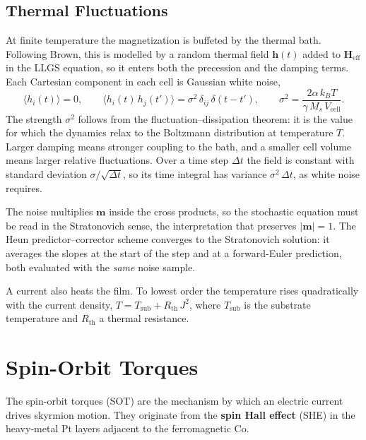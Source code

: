 \documentclass[11pt,a4paper]{article}
\newcommand{\mb}[1]{\mathbf{#1}}
\newcommand{\Heff}{\mb{H}_{\text{eff}}}
\newcommand{\Ms}{M_s}
\begin{document}
\subsection{Thermal Fluctuations}
\label{sec:thermal}

At finite temperature the magnetization is buffeted by the
thermal bath.  Following Brown, this is modelled by a random
thermal field $\mb{h}(t)$ added to $\Heff$ in the LLGS equation,
so it enters both the precession and the damping terms.  Each
Cartesian component in each cell is Gaussian white noise,
%
\begin{equation}
\langle h_i(t) \rangle = 0,
\qquad
\langle h_i(t)\, h_j(t') \rangle =
    \sigma^2\, \delta_{ij}\, \delta(t - t'),
\qquad
\sigma^2 = \frac{2\alpha\, k_B T}{\gamma\, \Ms\, V_{\text{cell}}} .
\end{equation}
%
The strength $\sigma^2$ follows from the fluctuation--dissipation
theorem: it is the value for which the dynamics relax to the
Boltzmann distribution at temperature $T$.  Larger damping means
stronger coupling to the bath, and a smaller cell volume means
larger relative fluctuations.  Over a time step $\Delta t$ the
field is constant with standard deviation $\sigma/\sqrt{\Delta t}$,
so its time integral has variance $\sigma^2\,\Delta t$, as white
noise requires.

The noise multiplies $\mb{m}$ inside the cross products, so the
stochastic equation must be read in the Stratonovich sense, the
interpretation that preserves $|\mb{m}| = 1$.  The Heun
predictor--corrector scheme converges to the Stratonovich solution:
it averages the slopes at the start of the step and at a
forward-Euler prediction, both evaluated with the \emph{same} noise
sample.

A current also heats the film.  To lowest order the temperature
rises quadratically with the current density,
$T = T_{\text{sub}} + R_{\text{th}}\, J^2$, where $T_{\text{sub}}$
is the substrate temperature and $R_{\text{th}}$ a thermal
resistance.


\section{Spin-Orbit Torques}

The spin-orbit torques (SOT) are the mechanism by which an electric
current drives skyrmion motion.  They originate from the
\textbf{spin Hall effect} (SHE) in the heavy-metal Pt layers
adjacent to the ferromagnetic Co.
\end{document}
